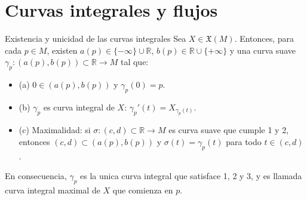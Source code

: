 \chapter{Curvas integrales y flujos}
\label{ch:teo-16}
\begin{booktheorem}{Existencia y unicidad de las curvas integrales}
Sea $X \in \mathfrak X(M)$. Entonces, para cada $p \in M$, existen $a(p)\in\{-\infty\}\cup\mathbb R$, $b(p)\in\mathbb R\cup\{+\infty\}$ y una curva suave $\gamma_p:(a(p),b(p))\subset\mathbb R\to M$ tal que:

\begin{itemize}
\item (a) $0\in(a(p),b(p))$ y $\gamma_p(0)=p$.
\item (b)  $\gamma_p$ es curva integral de $X$: $\gamma_p'(t)=X_{\gamma_p(t)}$.
\item (c) Maximalidad: si $\sigma:(c,d)\subset\mathbb R\to M$ es curva suave que cumple 1 y 2, entonces $(c,d)\subset(a(p),b(p))$ y $\sigma(t)=\gamma_p(t)$ para todo $t\in(c,d)$.
\end{itemize}
En consecuencia, $\gamma_p$ es la unica curva integral que satisface 1, 2 y 3, y es llamada curva integral maximal de $X$ que comienza en $p$.

\end{booktheorem}
